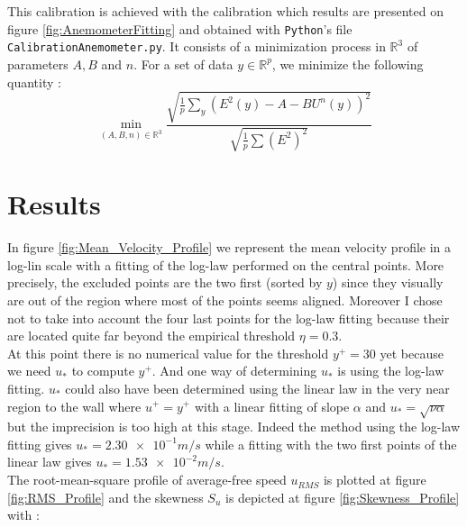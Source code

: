 \documentclass[12pt]{article}
\begin{document}
This calibration is achieved with the calibration which results are presented on figure \ref{fig:AnemometerFitting} and obtained with \verb|Python|'s file \verb|CalibrationAnemometer.py|. It consists of a minimization process in $\mathbb{R}^3$ of parameters $A,B$ and $n$. For a set of data $y \in \mathbb{R}^p$, we minimize the following quantity : \\ 

\begin{equation}
    \min_{(A,B,n)\in\mathbb{R}^3} \frac{\sqrt{\frac{1}{p} \sum_{y} \left( E^2(y) - A - BU^n(y) \right)^2 }}{\sqrt{ \frac{1}{p} \sum \left( E^2\right)^2}}
\end{equation}




\newpage
\section{Results}

In figure \ref{fig:Mean_Velocity_Profile} we represent the mean velocity profile in a log-lin scale with a fitting of the log-law performed on the central points. More precisely, the excluded points are the two first (sorted by $y$) since they visually are out of the region where most of the points seems aligned.  Moreover I chose not to take into account the four last points for the log-law fitting because their are located quite far beyond the empirical threshold $\eta = 0.3$. \\

At this point there is no numerical value for the threshold $y^+=30$ yet because we need $u_*$ to compute $y^+$. And one way of determining $u_*$ is using the log-law fitting. $u_*$ could also have been determined using the linear law in the very near region to the wall where $u^+ = y^+$ with a linear fitting of slope $\alpha$ and $u_* = \sqrt{\nu\alpha}$ but the imprecision is too high at this stage. Indeed the method using the log-law fitting gives $u_* = \num{2.30e-1} \si{m/s}$ while a fitting with the two first points of the linear law gives $u_* = \num{1.53e-2} \si{m/s}$.\\

The root-mean-square profile of average-free speed $u_{RMS}$ is plotted at figure \ref{fig:RMS_Profile} and the skewness $S_u$ is depicted at figure \ref{fig:Skewness_Profile} with :\\
\end{document}

